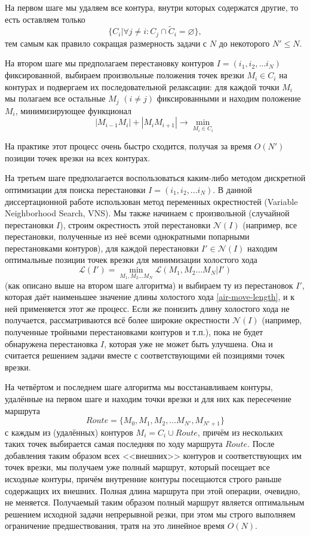 На первом шаге мы удаляем все контура,
внутри которых содержатся другие, 
то есть оставляем только
$$
\{C_i | \forall j \ne i: C_j \cap \widetilde C_i = \varnothing \},
$$
тем самым как правило сокращая размерность задачи с $N$
до некоторого $N' \leqslant N$.

На втором шаге мы предполагаем перестановку контуров 
$I = (i_1, i_2, ... i_N)$
фиксированной,
выбираем произвольные положения точек врезки
$M_i \in C_i$ на контурах и подвергаем их последовательной релаксации:
для каждой точки $M_i$
мы полагаем все остальные $M_j$ $(i\ne j)$ фиксированными и находим
положение $M_i$, минимизирующее функционал
$$
|M_{i-1}M_i|+|M_iM_{i+1}| \to \min_{M_i \in C_i}
$$

На практике этот процесс очень быстро сходится,
получая за время $O(N')$
позиции точек врезки на всех контурах.

На третьем шаге предполагается воспользоваться каким-либо
методом дискретной оптимизации для поиска перестановки
$I = (i_1, i_2, ... i_N)$.
В данной диссертационной работе использован метод
переменных окрестностей
(Variable Neighborhood Search,
VNS).
Мы также начинаем с произвольной
(случайной перестановки $I$),
строим окрестность этой перестановки 
$\mathcal N(I)$
(например, все перестановки,
полученные из неё всеми однократными попарными перестановками контуров),
для каждой перестановки $I'\in \mathcal N(I)$
находим оптимальные позиции точек врезки 
для минимизации холостого хода 
$$
\mathcal L (I') = \min_{M_1, M_2 \dots M_N}
  \mathcal L (M_1, M_2 \dots M_N | I')
$$
(как описано выше на втором шаге алгоритма)
и выбираем ту из перестановок $I'$,
которая даёт наименьшее значение длины 
холостого хода \eqref{air-move-length},
и к ней применяется этот же процесс.
Если же понизить длину холостого хода не получается,
рассматриваются всё более широкие окрестности 
$\mathcal N(I)$
(например, полученные тройными перестановками контуров
и т.п.), 
пока не будет обнаружена перестановка $I$,
которая уже не может быть улучшена.
Она и считается решением задачи
вместе с соответствующими ей позициями точек врезки.

На четвёртом и последнем шаге алгоритма
мы восстанавливаем контуры,
удалённые на первом шаге и находим точки
врезки и для них как пересечение маршрута
\begin{equation}
  \label{route0}
  Route = \{ M_0, M_1, M_2, \dots M_{N'}, M_{N'+1}\}
\end{equation}
с каждым из (удалённых) контуров
$M_i = C_i \cup Route$,
причём из нескольких таких точек
выбирается самая последняя по ходу маршрута
$Route$.
После добавления таким образом всех
<<внешних>> контуров
и соответствующих им точек врезки,
мы получаем уже полный маршрут,
который посещает все исходные контуры,
причём внутренние контуры посещаются
строго раньше содержащих их внешних.
Полная длина маршрута
при этой операции,
очевидно,
не меняется.
Получаемый таким образом полный маршрут
является оптимальным решением исходной задачи
непрерывной резки,
при этом
мы строго выполняем
ограничение предшествования,
тратя на это линейное время
$O(N)$.

